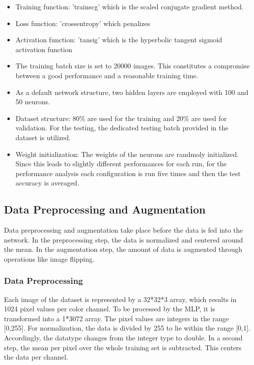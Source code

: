 \begin{itemize}
	\item Training function: 'trainscg' which is the scaled conjugate gradient method.

	\item Loss function: 'crossentropy' which penalizes

	\item Activation function: 'tansig' which is the hyperbolic tangent sigmoid activation function

	\item The training batch size is set to 20000 images. This constitutes a compromise between a good performance and a reasonable training time.

	\item As a default network structure, two hidden layers are employed with 100 and 50 neurons.

	\item Dataset structure: 80\% are used for the training and 20\% are used for validation. For the testing, the dedicated testing batch provided in the dataset is utilized.

	\item Weight initialization: The weights of the neurons are randmoly initialized. Since this leads to slightly different performances for each run, for the performance analysis each configuration is run five times and then the test accuracy is averaged.
\end{itemize}

\FloatBarrier
\subsection{Data Preprocessing and Augmentation}\label{subsec:preProp}

Data preprocessing and augmentation take place before the data is fed into the network. In the preprocessing step, the data is normalized and centered around the mean. In the augmentation step, the amount of data is augmented through operations like image flipping.

\subsubsection{Data Preprocessing}\label{subsub:dataPreProp}

  	Each image of the dataset is represented by a 32*32*3 array, which results in 1024 pixel values per color channel. To be processed by the MLP, it is transformed into a 1*3072 array. The pixel values are integers in the range [0,255]. For normalization, the data is divided by 255 to lie within the range [0,1]. Accordingly, the datatype changes from the integer type to double. In a second step, the mean per pixel over the whole training set is subtracted. This centers the data per channel.

